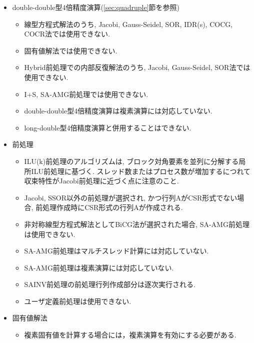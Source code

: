 \documentclass[a4paper]{jarticle}
\begin{document}
{{\begin{itemize}
\item double-double型4倍精度演算(\ref{sec:quadruple}節を参照)
\begin{itemize}
\item 線型方程式解法のうち, Jacobi, Gauss-Seidel, SOR, IDR(s), COCG, COCR法では使用できない.
\item 固有値解法では使用できない.
\item Hybrid前処理での内部反復解法のうち, Jacobi, Gauss-Seidel, SOR法では使用できない.
\item I+S, SA-AMG前処理では使用できない.
\item double-double型4倍精度演算は複素演算には対応していない.
\item long-double型4倍精度演算と併用することはできない.
\end{itemize}

\item 前処理
\begin{itemize}
\item ILU(k)前処理のアルゴリズムは, ブロック対角要素を並列に分解する局所ILU前処理\cite{nakajima}に基づく. スレッド数またはプロセス数が増加するにつれて収束特性がJacobi前処理に近づく点に注意のこと.
\item Jacobi, SSOR以外の前処理が選択され, かつ行列AがCSR形式でない場合,
      前処理作成時にCSR形式の行列Aが作成される.
\item 非対称線型方程式解法としてBiCG法が選択された場合, SA-AMG前処理は使用できない.
\item SA-AMG前処理はマルチスレッド計算には対応していない.
\item SA-AMG前処理は複素演算には対応していない.   
\item SAINV前処理の前処理行列作成部分は逐次実行される.
\item ユーザ定義前処理は使用できない.
\end{itemize}

\item 固有値解法
\begin{itemize}
\item 複素固有値を計算する場合には，複素演算を有効にする必要がある. 
\end{itemize}

\end{itemize}
\vspace*{5mm}

\newpage
}}
\end{document}
